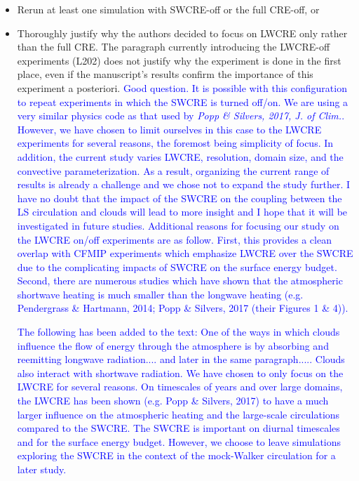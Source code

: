 \documentclass[draft]{agujournal2019}
\begin{document}
\begin{itemize}
  \item Rerun at least one simulation with SWCRE-off or the full CRE-off, or
  \item Thoroughly justify why the authors decided to focus on LWCRE only rather than the full CRE. The paragraph
currently introducing the LWCRE-off experiments (L202) does not justify why the experiment is done in the first
place, even if the manuscript’s results confirm the importance of this experiment a posteriori.
\textcolor{blue}{Good question.  It is possible with this configuration to repeat experiments in which the SWCRE is turned off/on.  
We are using a very similar physics code as that used by \textit{Popp \& Silvers, 2017, J. of Clim.}.   However, we have chosen to limit ourselves in this case to the 
LWCRE experiments for several reasons, the foremost being simplicity of focus.  In addition, the current study varies LWCRE, resolution, domain size, and 
the convective parameterization.  As a result, organizing the current range of results is already a challenge and we chose not to 
expand the study further.  I have no doubt that the impact of the SWCRE on the coupling between the LS circulation and clouds will lead 
to more insight and I hope that it will be investigated in future studies.  Additional reasons for focusing our study on the LWCRE on/off experiments
are as follow.  First, this provides a clean overlap with CFMIP experiments which emphasize LWCRE over the SWCRE due to the complicating impacts of
SWCRE on the surface energy budget.  Second, there are numerous studies which have shown that the atmospheric shortwave heating is 
much smaller than the longwave heating (e.g. Pendergrass \& Hartmann, 2014; Popp \& Silvers, 2017 (their Figures 1 \& 4)).}

\textcolor{blue}{The following has been added to the text: One of the ways in which clouds influence the flow of energy through the 
atmosphere is by absorbing and 
reemitting longwave radiation....  and later in the same paragraph..... Clouds also interact with shortwave radiation.  We have chosen 
to only focus on the LWCRE for several reasons.  
On timescales of years and over large domains, the LWCRE has been shown (e.g. Popp \& Silvers, 2017) to have a much larger 
influence on the atmospheric 
heating and the large-scale circulations compared to the SWCRE.  The SWCRE is important on diurnal timescales and for the surface
energy budget.  However, we choose to leave simulations exploring the SWCRE in the context of the mock-Walker circulation
for a later study.}
\end{itemize}
\end{document}
